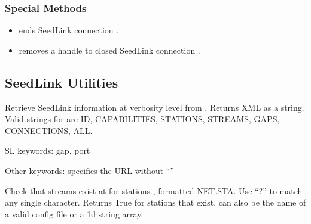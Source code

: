 \documentclass[letterpaper,11pt,english]{sphinxmanual}
\begin{document}
\subsubsection{Special Methods}
\label{\detokenize{src/Web/seedlink:special-methods}}\begin{itemize}
\item {} 
 ends SeedLink connection .

\item {} 
 removes a handle to closed SeedLink connection .

\end{itemize}


\subsection{SeedLink Utilities}
\label{\detokenize{src/Web/seedlink:seedlink-utilities}}

\begin{fulllineitems}
\label{\detokenize{src/Web/seedlink:SL_info}}
\end{fulllineitems}


Retrieve SeedLink information at verbosity level  from . Returns XML as a string. Valid strings for  are ID, CAPABILITIES, STATIONS, STREAMS, GAPS, CONNECTIONS, ALL.

\begin{fulllineitems}
\label{\detokenize{src/Web/seedlink:has_sta}}
\end{fulllineitems}


\begin{DUlineblock}{0em}
\item[] SL keywords: gap, port
\item[] Other keywords:  specifies the URL without “”
\end{DUlineblock}

Check that streams exist at  for stations , formatted
NET.STA. Use “?” to match any single character. Returns True for
stations that exist.  can also be the name of a valid config
file or a 1d string array.
\end{document}
